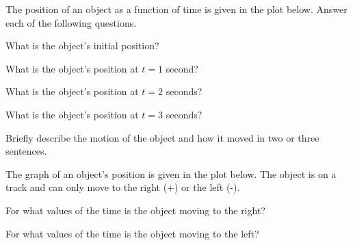 


\begin{problem}
\item The position of an object as a function of time is given in the plot
  below. Answer each of the following questions.

  \scalebox{0.5}{}

%

  \begin{subproblem}
  \item What is the object's initial position?
    \vfill

  \item What is the object's position at $t=1$ second?
    \vfill

  \item What is the object's position at $t=2$ seconds?
    \vfill

  \item What is the object's position at $t=3$ seconds?
    \vfill

  \item Briefly describe the motion of the object and how it moved in
    two or three sentences.
    \vfill
    \vfill

  \end{subproblem}

  \clearpage

\item The graph of an object's position is given in the plot
  below. The object is on a track and can only move to the right (+)
  or the left (-).

  \scalebox{0.4}{}

  \begin{subproblem}
    \item For what values of the time is the object moving to the
      right?
      \vfill
    \item For what values of the time is the object moving to the
      left?
      \vfill
  \end{subproblem}


\end{problem}

